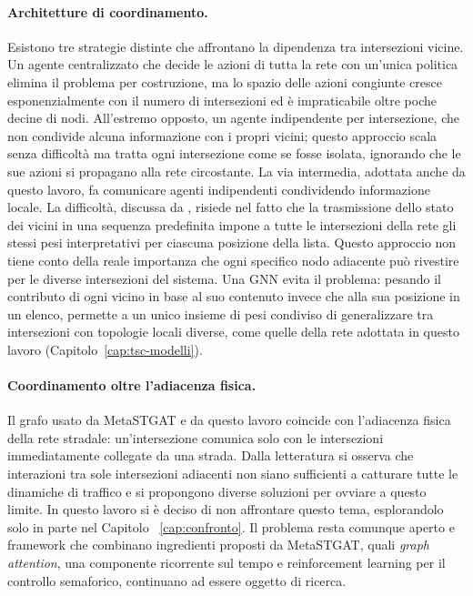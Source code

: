 \paragraph{Architetture di coordinamento.} Esistono tre strategie
distinte che affrontano la dipendenza tra intersezioni vicine. Un agente
centralizzato che decide le azioni di tutta la rete con un'unica politica
elimina il problema per costruzione, ma lo spazio delle azioni congiunte
cresce esponenzialmente con il numero di intersezioni ed è impraticabile
oltre poche decine di nodi. All'estremo opposto, un agente indipendente per
intersezione, che non condivide alcuna informazione con i propri vicini;
questo approccio scala senza difficoltà ma tratta ogni intersezione come se fosse isolata,
ignorando che le sue azioni si propagano alla rete circostante. La via
intermedia, adottata anche da questo lavoro, fa comunicare agenti
indipendenti condividendo informazione locale. La difficoltà, discussa da
\citet{wei2019colight}, risiede nel fatto che la trasmissione dello stato dei vicini in 
una sequenza predefinita impone a tutte le intersezioni della rete gli stessi 
pesi interpretativi per ciascuna posizione della lista. 
Questo approccio non tiene conto della reale importanza che ogni specifico 
nodo adiacente può rivestire per le diverse intersezioni del sistema.
Una GNN evita il problema: pesando il contributo di ogni vicino in
base al suo contenuto invece che alla sua posizione in un elenco, permette a
un unico insieme di pesi condiviso di generalizzare tra intersezioni con
topologie locali diverse, come quelle della rete adottata in
questo lavoro (Capitolo~\ref{cap:tsc-modelli}).

\paragraph{Coordinamento oltre l'adiacenza fisica.} Il grafo usato 
da MetaSTGAT e da questo lavoro coincide con l'adiacenza fisica
della rete stradale: un'intersezione comunica solo con le intersezioni
immediatamente collegate da una strada. Dalla letteratura si osserva
che interazioni tra sole intersezioni adiacenti non siano sufficienti a catturare tutte 
le dinamiche di traffico e si propongono diverse soluzioni per ovviare a questo limite. 
In questo lavoro si è deciso di non affrontare questo tema, esplorandolo solo in parte nel Capitolo ~\ref{cap:confronto}.
Il problema resta comunque aperto e framework che combinano ingredienti proposti da MetaSTGAT, 
quali \emph{graph attention}, una componente ricorrente sul tempo e reinforcement
learning per il controllo semaforico, continuano ad essere oggetto di ricerca.

